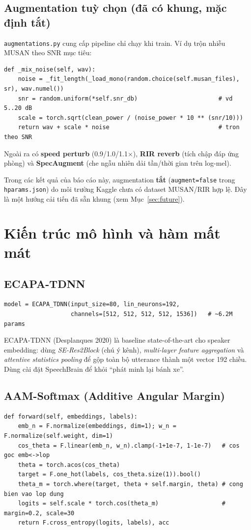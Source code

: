 \documentclass[12pt,a4paper]{article}
\begin{document}
\subsection{Augmentation tuỳ chọn (đã có khung, mặc định tắt)}
\texttt{augmentations.py} cung cấp pipeline chỉ chạy khi train. Ví dụ trộn nhiễu
MUSAN theo SNR mục tiêu:
\begin{lstlisting}
def _mix_noise(self, wav):
    noise = _fit_length(_load_mono(random.choice(self.musan_files), sr), wav.numel())
    snr = random.uniform(*self.snr_db)                       # vd 5..20 dB
    scale = torch.sqrt(clean_power / (noise_power * 10 ** (snr/10)))
    return wav + scale * noise                               # tron theo SNR
\end{lstlisting}
Ngoài ra có \textbf{speed perturb} (0.9/1.0/1.1$\times$), \textbf{RIR reverb}
(tích chập đáp ứng phòng) và \textbf{SpecAugment} (che ngẫu nhiên dải tần/thời gian
trên log-mel).

\begin{luuybox}
Trong các kết quả của báo cáo này, augmentation \textbf{tắt} (\texttt{augment=false}
trong \texttt{hparams.json}) do môi trường Kaggle chưa có dataset MUSAN/RIR hợp lệ.
Đây là một hướng cải tiến đã sẵn khung (xem Mục~\ref{sec:future}).
\end{luuybox}

\section{Kiến trúc mô hình và hàm mất mát}
\subsection{ECAPA-TDNN}
\begin{lstlisting}
model = ECAPA_TDNN(input_size=80, lin_neurons=192,
                   channels=[512, 512, 512, 512, 1536])   # ~6.2M params
\end{lstlisting}
ECAPA-TDNN (Desplanques 2020) là baseline state-of-the-art cho speaker embedding:
dùng \emph{SE-Res2Block} (chú ý kênh), \emph{multi-layer feature aggregation} và
\emph{attentive statistics pooling} để gộp toàn bộ utterance thành một vector 192
chiều. Dùng cài đặt SpeechBrain để khỏi ``phát minh lại bánh xe''.

\subsection{AAM-Softmax (Additive Angular Margin)}
\begin{lstlisting}
def forward(self, embeddings, labels):
    emb_n = F.normalize(embeddings, dim=1); w_n = F.normalize(self.weight, dim=1)
    cos_theta = F.linear(emb_n, w_n).clamp(-1+1e-7, 1-1e-7)   # cos goc emb<->lop
    theta = torch.acos(cos_theta)
    target = F.one_hot(labels, cos_theta.size(1)).bool()
    theta_m = torch.where(target, theta + self.margin, theta) # cong bien vao lop dung
    logits = self.scale * torch.cos(theta_m)                  # margin=0.2, scale=30
    return F.cross_entropy(logits, labels), acc
\end{lstlisting}
\end{document}

